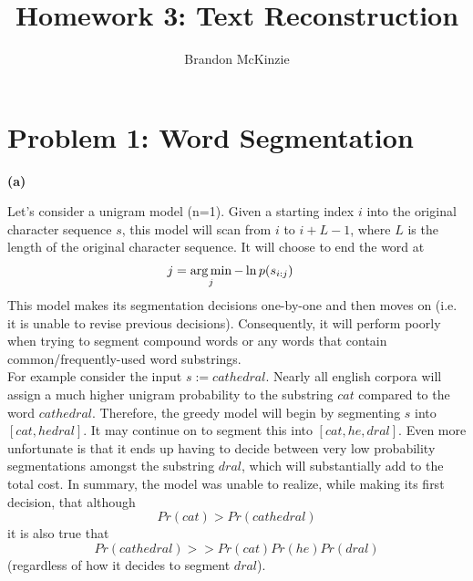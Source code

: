\documentclass[11pt]{article}
\title{\vspace{-10mm}\fontsize{24pt}{8pt}\selectfont\textbf{Homework 3: Text Reconstruction}\vspace*{-4mm}}
\author{Brandon McKinzie}
\date{}
\begin{document}
\maketitle

\section*{Problem 1: Word Segmentation}



\textbf{(a)} 

Let's consider a unigram model (n=1). Given a starting index $i$ into the original character sequence $s$, this model will scan from $i$ to $i + L - 1$, where $L$ is the length of the original character sequence. It will choose to end the word at 
\begin{align}
	j &= \operatorname*{arg\,min}_j - \ln p(s_{i:j})
\end{align}
This model makes its segmentation decisions one-by-one and then moves on (i.e. it is unable to revise previous decisions). Consequently, it will perform poorly when trying to segment compound words or any words that contain common/frequently-used word substrings. \\

For example consider the input $s := cathedral$. Nearly all english corpora will assign a much higher unigram probability to the substring $cat$ compared to the word $cathedral$. Therefore, the greedy model will begin by segmenting $s$ into $[cat, hedral]$. It may continue on to segment this into $[cat, he, dral]$. Even more unfortunate is that it ends up having to decide between very low probability segmentations amongst the substring $dral$, which will substantially add to the total cost. In summary, the model was unable to realize, while making its first decision, that although $$Pr(cat) > Pr(cathedral)$$ it is also true that $$Pr(cathedral) >> Pr(cat)Pr(he)Pr(dral)$$ (regardless of how it decides to segment $dral$).  
\end{document}

